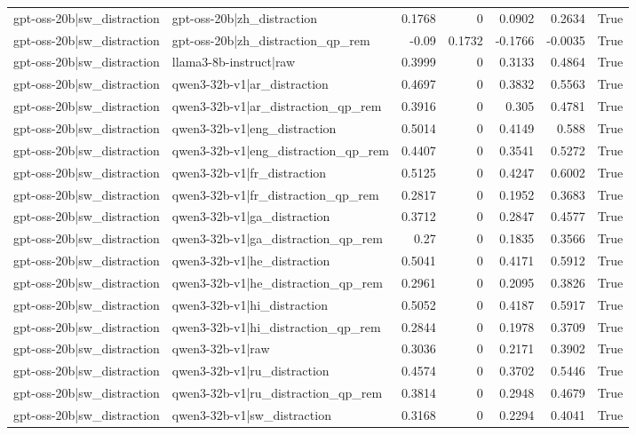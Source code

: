 \begin{table}
\begin{tabular}{l l r r r r l}
gpt-oss-20b|sw_distraction & gpt-oss-20b|zh_distraction & 0.1768 & 0 & 0.0902 & 0.2634 & True \\
gpt-oss-20b|sw_distraction & gpt-oss-20b|zh_distraction_qp_rem & -0.09 & 0.1732 & -0.1766 & -0.0035 & True \\
gpt-oss-20b|sw_distraction & llama3-8b-instruct|raw & 0.3999 & 0 & 0.3133 & 0.4864 & True \\
gpt-oss-20b|sw_distraction & qwen3-32b-v1|ar_distraction & 0.4697 & 0 & 0.3832 & 0.5563 & True \\
gpt-oss-20b|sw_distraction & qwen3-32b-v1|ar_distraction_qp_rem & 0.3916 & 0 & 0.305 & 0.4781 & True \\
gpt-oss-20b|sw_distraction & qwen3-32b-v1|eng_distraction & 0.5014 & 0 & 0.4149 & 0.588 & True \\
gpt-oss-20b|sw_distraction & qwen3-32b-v1|eng_distraction_qp_rem & 0.4407 & 0 & 0.3541 & 0.5272 & True \\
gpt-oss-20b|sw_distraction & qwen3-32b-v1|fr_distraction & 0.5125 & 0 & 0.4247 & 0.6002 & True \\
gpt-oss-20b|sw_distraction & qwen3-32b-v1|fr_distraction_qp_rem & 0.2817 & 0 & 0.1952 & 0.3683 & True \\
gpt-oss-20b|sw_distraction & qwen3-32b-v1|ga_distraction & 0.3712 & 0 & 0.2847 & 0.4577 & True \\
gpt-oss-20b|sw_distraction & qwen3-32b-v1|ga_distraction_qp_rem & 0.27 & 0 & 0.1835 & 0.3566 & True \\
gpt-oss-20b|sw_distraction & qwen3-32b-v1|he_distraction & 0.5041 & 0 & 0.4171 & 0.5912 & True \\
gpt-oss-20b|sw_distraction & qwen3-32b-v1|he_distraction_qp_rem & 0.2961 & 0 & 0.2095 & 0.3826 & True \\
gpt-oss-20b|sw_distraction & qwen3-32b-v1|hi_distraction & 0.5052 & 0 & 0.4187 & 0.5917 & True \\
gpt-oss-20b|sw_distraction & qwen3-32b-v1|hi_distraction_qp_rem & 0.2844 & 0 & 0.1978 & 0.3709 & True \\
gpt-oss-20b|sw_distraction & qwen3-32b-v1|raw & 0.3036 & 0 & 0.2171 & 0.3902 & True \\
gpt-oss-20b|sw_distraction & qwen3-32b-v1|ru_distraction & 0.4574 & 0 & 0.3702 & 0.5446 & True \\
gpt-oss-20b|sw_distraction & qwen3-32b-v1|ru_distraction_qp_rem & 0.3814 & 0 & 0.2948 & 0.4679 & True \\
gpt-oss-20b|sw_distraction & qwen3-32b-v1|sw_distraction & 0.3168 & 0 & 0.2294 & 0.4041 & True \\

\end{tabular}
\end{table}
